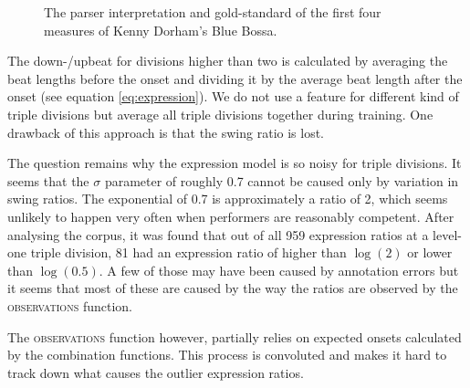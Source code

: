\begin{figure}
\centering
{}

\caption{The parser interpretation and gold-standard of the first four measures of Kenny Dorham's Blue Bossa.}
\label{fig:blue_bossa}
\end{figure}

The down-/upbeat for divisions higher than two is calculated by averaging the beat lengths before the onset and dividing it by the average beat length after the onset (see equation \ref{eq:expression}). We do not use a feature for different kind of triple divisions but average all triple divisions together during training. One drawback of this approach is that the swing ratio is lost.

The question remains why the expression model is so noisy for triple divisions. It seems that the $\sigma$ parameter of roughly 0.7 cannot be caused only by variation in swing ratios. The exponential of 0.7 is approximately a ratio of 2, which seems unlikely to happen very often when performers are reasonably competent. After analysing the corpus, it was found that out of all 959 expression ratios at a level-one triple division, 81 had an expression ratio of higher than $\log(2)$ or lower than $\log(0.5)$. A few of those may have been caused by annotation errors but it seems that most of these are caused by the way the ratios are observed by the \textsc{observations} function.

The \textsc{observations} function however, partially relies on expected onsets calculated by the combination functions. This process is convoluted and makes it hard to track down what causes the outlier expression ratios.

